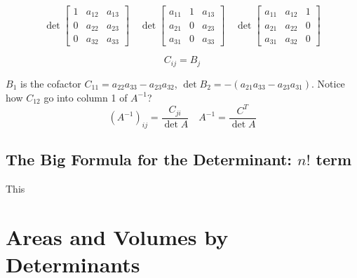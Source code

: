 \[
\det\!\begin{bmatrix}
1 & a_{12} & a_{13}\\
0 & a_{22} & a_{23}\\
0 & a_{32} & a_{33}
\end{bmatrix}\quad
\det\!\begin{bmatrix}
a_{11} & 1 & a_{13}\\
a_{21} & 0 & a_{23}\\
a_{31} & 0 & a_{33}
\end{bmatrix}\quad
\det\!\begin{bmatrix}
a_{11} & a_{12} & 1\\
a_{21} & a_{22} & 0\\
a_{31} & a_{32} & 0
\end{bmatrix}
\]

\[
  C_{ij} = B_j 
\]

\(B_1\) is the cofactor \(C_{11} = a_{22}a_{33} - a_{23}a_{32}\), \(\det B_2 = -(a_{21}a_{33} - a_{23}a_{31})\). Notice how \(C_{12} \) go into column 1 of \(A^{-1} \)? 
\[
  (A^{-1} )_{ij} = \frac{C_{ji} }{\det A} 
  \quad 
  A^{-1} = \frac{C^T}{\det A} 
\]     

\subsection{The Big Formula for the Determinant: \(n!\) term }

This




\section{Areas and Volumes by Determinants}
